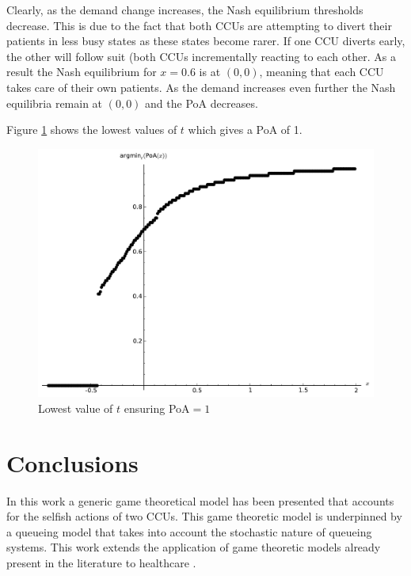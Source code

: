 \documentclass{article}
\begin{document}
Clearly, as the demand change increases, the Nash equilibrium thresholds decrease.
This is due to the fact that both CCUs are attempting to divert their patients in less busy states as these states become rarer.
If one CCU diverts early, the other will follow suit (both CCUs incrementally reacting to each other.
As a result the Nash equilibrium for $x=0.6$ is at $(0,0)$, meaning that each CCU takes care of their own patients.
As the demand increases even further the Nash equilibria remain at $(0,0)$ and the PoA decreases.

Figure \ref{mintargetvdemandmodel2} shows the lowest values of $t$ which gives a PoA of 1.

\begin{figure}[!htbp]
\begin{center}
\includegraphics[width=12cm]{./Images/argminPoAmodel2.pdf}
\caption{Lowest value of $t$ ensuring PoA$=1$} \label{mintargetvdemandmodel2}
\end{center}
\end{figure}

\section{Conclusions}\label{conclusions}

In this work a generic game theoretical model has been presented that accounts for the selfish actions of two CCUs.
This game theoretic model is underpinned by a queueing model that takes into account the stochastic nature of queueing systems.
This work extends the application of game theoretic models already present in the literature to healthcare \cite{li2002cooperative, xie2006note}.
\end{document}

